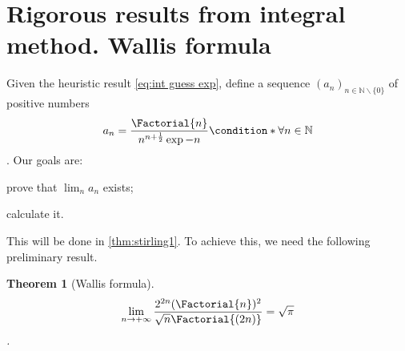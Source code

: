 \documentclass[onecolumn,a4paper,11pt]{article}
\newcommand{\numberset}{\mathbb}
\providecommand{\N}{\numberset{N}}
\theoremstyle{classicdef}
\newtheorem{theorem}{Theorem}[section]
\theoremstyle{remark}
\begin{document}
\section{Rigorous results from integral method. Wallis formula\label{sec:Wallis}}
Given the heuristic result \cref{eq:int guess exp},
define a sequence $(a_{n})_{n\in\N\backslash\{0\}}$ of positive numbers
\begin{dmath*}
   a_{n} = \frac{\Factorial{n}}{n^{n+\frac{1}{2}} \exp{-n}}  
\condition*{\forall n\in\N}
\end{dmath*}.
Our goals are:
\begin{inparaenum}[(a)]
\item prove that $\lim_{n} a_{n}$ exists;
\item calculate it.
\end{inparaenum}
This will be done in \cref{thm:stirling1}.
To achieve this,
we need the following preliminary result.
\begin{theorem}[Wallis formula]
   \label{thm:Wallis}
\begin{dmath}[label={Wallis}]
   \lim_{n\rightarrow+\infty} \frac{2^{2n} (\Factorial{n})^{2}}{\sqrt{n}
      \Factorial{(2n)}} = \sqrt{\pi}
\end{dmath}.
\end{theorem}
\end{document}
